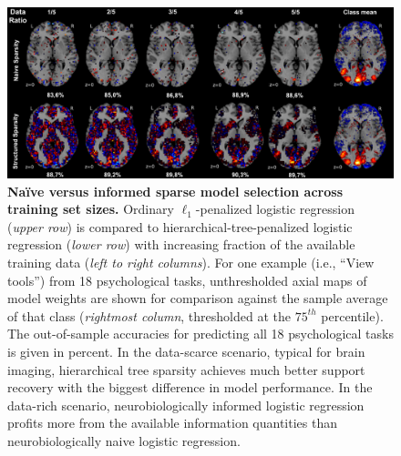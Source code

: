 \documentclass{article} %
\begin{document}
\begin{figure}
\begin{centering}
\includegraphics[width=1.00\textwidth]{figures/dataratio_trans.pdf}
\end{centering}
\vspace{-0.6cm}
\caption{\textbf{Na\"ive versus informed sparse model selection
across training set sizes.}
Ordinary $\ell_1$-penalized logistic regression
(\textit{upper row})
is compared
to hierarchical-tree-penalized logistic regression
(\textit{lower row})
with increasing fraction
of the available training data (\textit{left to right columns}).
For one example (i.e., ``View tools'') from 18 psychological tasks,
unthresholded axial maps of model weights
are shown for comparison against
the sample average of that class
(\textit{rightmost column}, thresholded at the $75^{th}$ percentile).
The out-of-sample accuracies for predicting all 18 psychological tasks
is given in percent.
%
In the data-scarce scenario,
typical for brain imaging,
hierarchical tree sparsity achieves much
better support recovery with the biggest difference
in model performance.
%
In the data-rich scenario,
neurobiologically informed logistic regression
profits more from the available information quantities than
neurobiologically naive logistic regression.
}
\label{fig_dataratio}
\end{figure}
\end{document}
